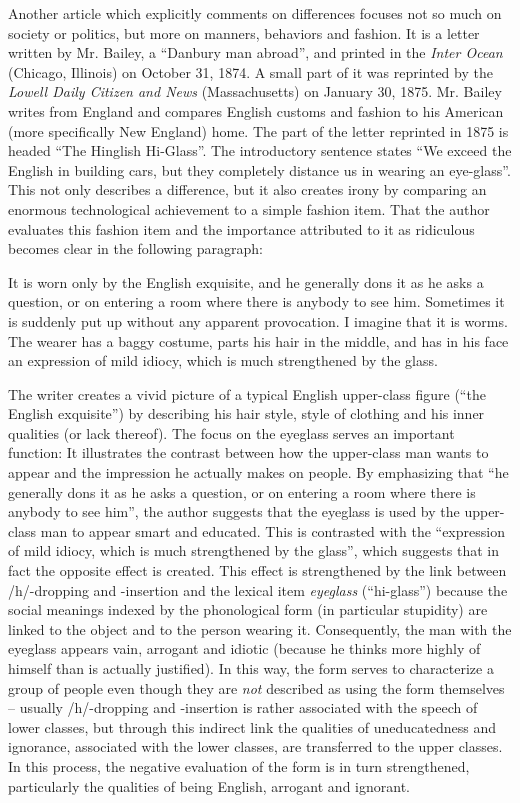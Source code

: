 Another article which explicitly comments on differences focuses not so much on society or politics, but more on manners, behaviors and fashion. It is a letter written by Mr. Bailey, a “Danbury man abroad”, and printed in the \emph{Inter Ocean} (Chicago, Illinois) on October 31, 1874. A small part of it was reprinted by the \emph{Lowell Daily Citizen and News} (Massachusetts) on January 30, 1875. Mr. Bailey writes from England and compares English customs and fashion to his American (more specifically New England) home. The part of the letter reprinted in 1875 is headed “The Hinglish Hi-Glass”. The introductory sentence states “We exceed the English in building cars, but they completely distance us in wearing an eye-glass”. This not only describes a difference, but it also creates irony by comparing an enormous technological achievement to a simple fashion item. That the author evaluates this fashion item and the importance attributed to it as ridiculous becomes clear in the following paragraph:

\begin{ipquote}
It is worn only by the English exquisite, and he generally dons it as he asks a question, or on entering a room where there is anybody to see him. Sometimes it is suddenly put up without any apparent provocation. I imagine that it is worms. The wearer has a baggy costume, parts his hair in the middle, and has in his face an expression of mild idiocy, which is much strengthened by the glass.
\end{ipquote}


The writer creates a vivid picture of a typical English upper-class figure (“the English exquisite”) by describing his hair style, style of clothing and his inner qualities (or lack thereof). The focus on the eyeglass serves an important function: It illustrates the contrast between how the upper-class man wants to appear and the impression he actually makes on people. By emphasizing that “he generally dons it as he asks a question, or on entering a room where there is anybody to see him”, the author suggests that the eyeglass is used by the upper-class man to appear smart and educated. This is contrasted with the “expression of mild idiocy, which is much strengthened by the glass”, which suggests that in fact the opposite effect is created. This effect is strengthened by the link between /h/-dropping and -insertion and the lexical item \emph{eyeglass} (“hi-glass”) because the social meanings indexed by the phonological form (in particular stupidity) are linked to the object and to the person wearing it. Consequently, the man with the eyeglass appears vain, arrogant and idiotic (because he thinks more highly of himself than is actually justified). In this way, the form serves to characterize a group of people even though they are \emph{not} described as using the form themselves – usually /h/-dropping and -insertion is rather associated with the speech of lower classes, but through this indirect link the qualities of uneducatedness and ignorance, associated with the lower classes, are transferred to the upper classes. In this process, the negative evaluation of the form is in turn strengthened, particularly the qualities of being English, arrogant and ignorant.


